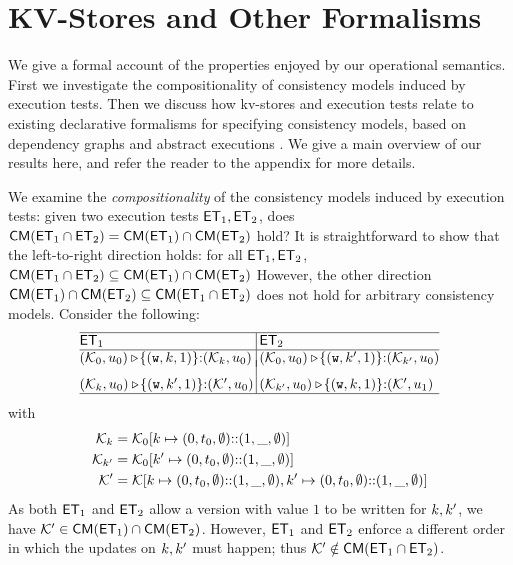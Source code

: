 \newcommand{\execs}{\ensuremath{\mathsf{Execs}}}

\section{KV-Stores and Other Formalisms}
\label{sec:other_formalisms}

We give a formal account of the properties enjoyed by our operational 
semantics. 
First we investigate the compositionality of consistency models 
induced by execution tests. Then we discuss how kv-stores and execution 
tests relate to existing declarative formalisms for specifying  
consistency models, based on dependency graphs \cite{adya} 
and abstract executions \cite{framework-concur}. 
We give a main overview of our results here, and refer the reader to the 
appendix for more details.

We examine the \emph{compositionality} of the  consistency models induced by execution tests:  
\ie given two execution tests $\mathsf{ET}_1, \mathsf{ET}_2$, does 
$\mathsf{CM}(\mathsf{ET}_1 \cap \mathsf{ET}_2) = \mathsf{CM}(\mathsf{ET}_1) \cap \mathsf{CM}(\mathsf{ET}_2)$ hold? 
It is straightforward to show that the left-to-right direction holds: for all $\mathsf{ET}_1, \mathsf{ET}_2$, \( \mathsf{CM}(\mathsf{ET}_1 \cap \mathsf{ET}_2) \subseteq \mathsf{CM}(\mathsf{ET}_1) \cap \mathsf{CM}(\mathsf{ET}_2) \) 
However, the other direction \( \mathsf{CM}(\mathsf{ET}_1) \cap \mathsf{CM}(\mathsf{ET}_2) \subseteq \mathsf{CM}(\mathsf{ET}_1 \cap \mathsf{ET}_2) \) does not hold for arbitrary consistency models.
Consider the following:
\[
\small
\begin{array}{@{}l @{\hspace{2pt}} | @{\hspace{2pt}} l@{}}
    \hline
    \ET_1 & \ET_2 \\
%    
    \hline
    (\hh_{0}, \vi_{0}) \csat\! \{(\otW, \ke, 1)\} {:} ( \hh_{\ke}, \vi_{0})
    &
    (\hh_{0}, \vi_{0}) \csat\! \{(\otW, \ke', 1)\} {:} ( \hh_{\ke'}, \vi_{0}) 
    \vspace{-5pt}\\\\
    (\hh_{\ke}, \vi_{0}) \csat  \!\{(\otW, \ke', 1)\} {:} (\hh',\vi_{0}) 
    &
    (\hh_{\ke'}, \vi_{0}) \csat \!\{(\otW, \ke, 1)\} {:} (\hh',\vi_{1}) 
    \\
\hline
\end{array}
\]
with 
\begin{align*}
    \mathcal{K}_{k} & = \mathcal{K}_{0}[k \mapsto (0, t_{0}, \emptyset) \mathbb{::} (1, \_, \emptyset)] \\
    \mathcal{K}_{k'} & = \mathcal{K}_{0}[k' \mapsto (0, t_{0}, \emptyset) \mathbb{::} (1, \_, \emptyset)] \\
    \mathcal{K}' & = \mathcal{K}[k \mapsto (0, t_{0}, \emptyset) \mathbb{::} (1, \_, \emptyset) 
                ,k' \mapsto (0, t_{0}, \emptyset) \mathbb{::} (1, \_, \emptyset)] \\
\end{align*}
As both $\mathsf{ET}_1$ and $\mathsf{ET}_2$ allow a version with value $1$ to be written for 
$k, k'$,  we have $\mathcal{K}' \in \mathsf{CM}(\mathsf{ET}_1) \cap \mathsf{CM}(\mathsf{ET}_2)$. 
However, $\mathsf{ET}_1$ and $\mathsf{ET}_2$ enforce a different order in which the updates on $k, k'$ must happen; 
thus $\mathcal{K}' \notin \mathsf{CM}(\mathsf{ET}_1 \cap \mathsf{ET}_2)$. 

